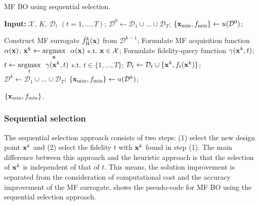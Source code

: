 \documentclass[journal ]{new-aiaa}
\begin{document}
	\begin{algorithm}
		\caption{MF BO using sequential selection.}\label{Algo5}
		\begin{algorithmic}[1]
			\State \textbf{Input:} $\mathcal{X}$, $K$, $\mathcal{D}_t$ $(t=1,\dots,T)$;
			\State $\mathcal{D}^0 \gets \mathcal{D}_1 \cup \dots \cup \mathcal{D}_T$;
			\State $\{{\bf x}_{\min},f_{\min}\} \gets u(\mathcal{D}^0)$;
			
			\State Construct MF surrogate $\hat{f}_\text{H}^k({\bf x})$ from $\mathcal{D}^{k-1}$;
			\State Formulate MF acquisition function $\alpha({\bf x})$;
			\State ${\bf x}^{k} \gets \underset{{\bf x}}{\mathrm{argmax}} \ \ \alpha({\bf x})$ s.t. ${\bf x} \in \mathcal{X}$; \label{Algo5:7}
			\State Formulate fidelity-query function $\gamma({\bf x}^{k},t)$; \label{Algo5:8}
			\State $t \gets \underset{t}{\mathrm{argmax}} \ \ \gamma({\bf x}^{k},t)$ s.t. $t \in \{1,\dots,T\}$; \label{Algo5:9}
			\State $\mathcal{D}_t \gets \mathcal{D}_t \cup \{{\bf x}^{k},f_t({\bf x}^{k})\}$; \label{Algo5:10}
			\State $\mathcal{D}^k \gets \mathcal{D}_1 \cup \dots \cup \mathcal{D}_T$;
			\State $\{{\bf x}_{\min},f_{\min}\} \gets u(\mathcal{D}^k)$;
			\EndFor
			
			\State \Return $\{{\bf x}_{\min},f_{\min}\}$.
		\end{algorithmic}
	\end{algorithm}
	
	\subsubsection{Sequential selection}\label{Sec523}
	
	The sequential selection approach consists of two steps: (1) select the new design point ${\bf x}^k$ and (2) select the fidelity $t$ with ${\bf x}^k$ found in step (1).
	The main difference between this approach and the heuristic approach is that the selection of ${\bf x}^k$ is independent of that of $t$.
	This means, the solution improvement is separated from the consideration of computational cost and the accuracy improvement of the MF surrogate.
	 shows the pseudo-code for MF BO using the sequential selection approach.
	
\end{document}
